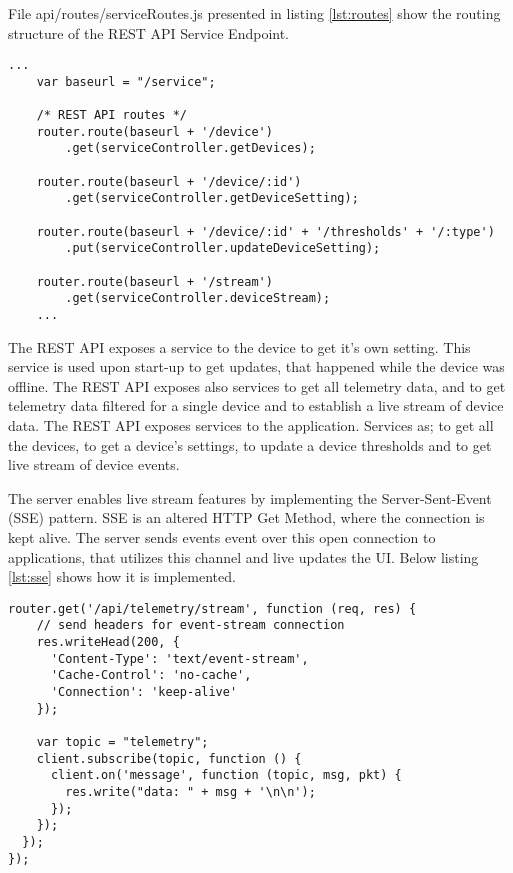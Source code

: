     File api/routes/serviceRoutes.js presented in listing \ref{lst:routes} show the routing structure of the REST API Service Endpoint. 

\begin{lstlisting}[style=js, caption=Node.js REST API Routes, label={lst:routes}]
    ...
    var baseurl = "/service";

    /* REST API routes */
    router.route(baseurl + '/device')
        .get(serviceController.getDevices);

    router.route(baseurl + '/device/:id')
        .get(serviceController.getDeviceSetting);

    router.route(baseurl + '/device/:id' + '/thresholds' + '/:type')
        .put(serviceController.updateDeviceSetting);

    router.route(baseurl + '/stream')
        .get(serviceController.deviceStream); 
    ...
\end{lstlisting}

The REST API exposes a service to the device to get it's own setting. This service is used upon start-up to get updates, that happened while the device was offline. 
The REST API exposes also services to get all telemetry data, and to get telemetry data filtered for a single device and to establish a live stream of device data. 
The REST API exposes services to the application. Services as; to get all the devices, to get a device's settings, to update a device thresholds and to get live stream of device events. 

The server enables live stream features by implementing the Server-Sent-Event (SSE) pattern. SSE is an altered HTTP Get Method, where the connection is kept alive. The server sends events event over this open connection to applications, that utilizes this channel and live updates the UI. Below listing \ref{lst:sse} shows how it is implemented.

\begin{lstlisting}[style=js, caption=Server Sent Event, label={lst:sse}]
    router.get('/api/telemetry/stream', function (req, res) {
    // send headers for event-stream connection
    res.writeHead(200, {
      'Content-Type': 'text/event-stream',
      'Cache-Control': 'no-cache',
      'Connection': 'keep-alive'
    });

    var topic = "telemetry";
    client.subscribe(topic, function () {
      client.on('message', function (topic, msg, pkt) {
        res.write("data: " + msg + '\n\n');
      });
    });
  });
});
\end{lstlisting}

